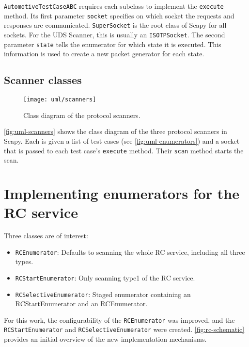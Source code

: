 \texttt{AutomotiveTestCaseABC} requires each subclass to implement the \texttt{execute} method. Its first parameter \texttt{socket} specifies on which socket the requests and responses are communicated. \texttt{SuperSocket} is the root class of Scapy for all sockets. For the UDS Scanner, this is usually an \texttt{ISOTPSocket}. The second parameter \texttt{state} tells the enumerator for which state it is executed. This information is used to create a new packet generator for each state.


\subsection{Scanner classes}

\begin{figure}[htb]
    \centering
    \texttt{[image: uml/scanners]}
    \caption{Class diagram of the protocol scanners.}
    \label{fig:uml-scanners}
\end{figure}

\autoref{fig:uml-scanners} shows the class diagram of the three protocol scanners in Scapy. Each is given a list of test cases (see \autoref{fig:uml-enumerators}) and a socket that is passed to each test case's \texttt{execute} method. Their \texttt{scan} method starts the scan.

\newpage

\section{Implementing enumerators for the RC service}

Three classes are of interest:

\begin{itemize}
    \item \texttt{RCEnumerator}: Defaults to scanning the whole RC service, including all three types.
    \item \texttt{RCStartEnumerator}: Only scanning type1 of the RC service.
    \item \texttt{RCSelectiveEnumerator}: Staged enumerator containing an RCStartEnumerator and an RCEnumerator.
\end{itemize}

For this work, the configurability of the \texttt{RCEnumerator} was improved, and the \texttt{RCStartEnumerator} and \texttt{RCSelectiveEnumerator} were created. \autoref{fig:rc-schematic} provides an initial overview of the new implementation mechanisms.

